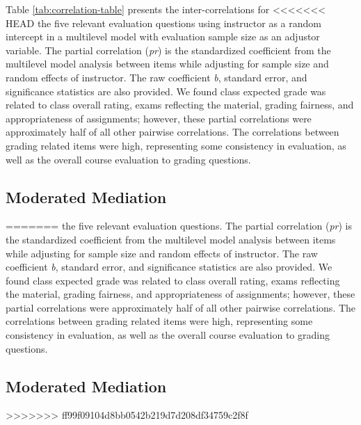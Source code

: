 \documentclass[,man]{apa6}
\theoremstyle{definition}
\theoremstyle{definition}
\theoremstyle{definition}
\theoremstyle{remark}
\begin{document}
Table \ref{tab:correlation-table} presents the inter-correlations for
<<<<<<< HEAD
the five relevant evaluation questions using instructor as a random
intercept in a multilevel model with evaluation sample size as an
adjustor variable. The partial correlation (\emph{pr}) is the
standardized coefficient from the multilevel model analysis between
items while adjusting for sample size and random effects of instructor.
The raw coefficient \emph{b}, standard error, and significance
statistics are also provided. We found class expected grade was related
to class overall rating, exams reflecting the material, grading
fairness, and appropriateness of assignments; however, these partial
correlations were approximately half of all other pairwise correlations.
The correlations between grading related items were high, representing
some consistency in evaluation, as well as the overall course evaluation
to grading questions.

\subsection{Moderated Mediation}\label{moderated-mediation}
=======
the five relevant evaluation questions. The partial correlation
(\emph{pr}) is the standardized coefficient from the multilevel model
analysis between items while adjusting for sample size and random
effects of instructor. The raw coefficient \emph{b}, standard error, and
significance statistics are also provided. We found class expected grade
was related to class overall rating, exams reflecting the material,
grading fairness, and appropriateness of assignments; however, these
partial correlations were approximately half of all other pairwise
correlations. The correlations between grading related items were high,
representing some consistency in evaluation, as well as the overall
course evaluation to grading questions.

\hypertarget{moderated-mediation}{%
\subsection{Moderated Mediation}\label{moderated-mediation}}
>>>>>>> ff99f09104d8bb0542b219d7d208df34759c2f8f
\end{document}
